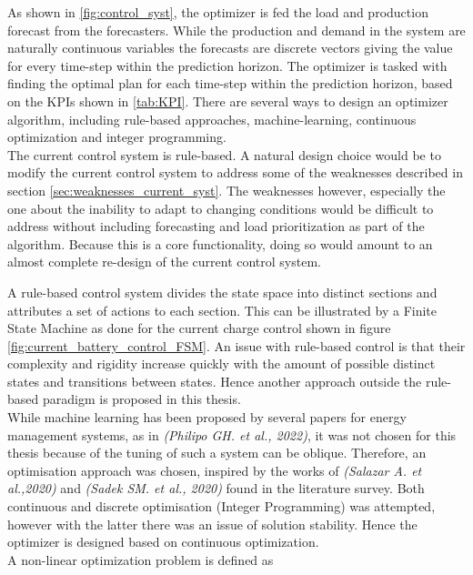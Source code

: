 As shown in \ref{fig:control_syst}, the optimizer is fed the load and production forecast from the forecasters. While the production and demand in the system are naturally continuous variables the forecasts are discrete vectors giving the value for every time-step within the prediction horizon.  The optimizer is tasked with finding the optimal plan for each time-step within the prediction horizon, based on the KPIs shown in \ref{tab:KPI}. There are several ways to design an optimizer algorithm, including rule-based approaches, machine-learning, continuous optimization and integer programming.\\

The current control system is rule-based. A natural design choice would be to modify the current control system to address some of the weaknesses described in section \ref{sec:weaknesses_current_syst}. The weaknesses however, especially the one about the inability to adapt to changing conditions would be difficult to address without including forecasting and load prioritization as part of the algorithm. Because this is a core functionality, doing so would amount to an almost complete re-design of the current control system. 

A rule-based control system divides the state space into distinct sections and attributes a set of actions to each section. This can be illustrated by a Finite State Machine as done for the current charge control shown in figure \ref{fig:current_battery_control_FSM}. An issue with rule-based control is that their complexity and rigidity increase quickly with the amount of possible distinct states and transitions between states.\cite{Casini2022-bs} Hence another approach outside the rule-based paradigm is proposed in this thesis.\\

While machine learning has been proposed by several papers for energy management systems, as in \textit{(Philipo GH. et al., 2022)},\cite{Philipo2022-rx} it was not chosen for this thesis because of the tuning of such a system can be oblique. Therefore, an optimisation approach was chosen, inspired by the works of \textit{(Salazar A. et al.,2020)} and \textit{(Sadek SM. et al., 2020)} found in the literature survey. Both continuous and discrete optimisation (Integer Programming) was attempted, however with the latter there was an issue of solution stability. Hence the optimizer is designed based on continuous optimization. \\

A non-linear optimization problem is defined as 


